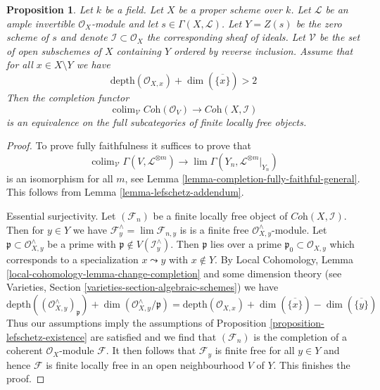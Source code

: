 \documentclass{stacks-project}
\theoremstyle{plain}
\newtheorem{proposition}[subsection]{Proposition}
\theoremstyle{definition}
\theoremstyle{remark}
\numberwithin{equation}{subsection}
\def\lim{\mathop{\mathrm{lim}}\nolimits}
\def\colim{\mathop{\mathrm{colim}}\nolimits}
\begin{document}
\begin{proposition}
\label{proposition-lefschetz-equivalence}
Let $k$ be a field. Let $X$ be a proper scheme over $k$.
Let $\mathcal{L}$ be an ample invertible $\mathcal{O}_X$-module
and let $s \in \Gamma(X, \mathcal{L})$. Let $Y = Z(s)$
be the zero scheme of $s$ and denote $\mathcal{I} \subset \mathcal{O}_X$
the corresponding sheaf of ideals.
Let $\mathcal{V}$ be the set of open subschemes of $X$ containing $Y$
ordered by reverse inclusion.
Assume that for all $x \in X \setminus Y$ we have
$$
\text{depth}(\mathcal{O}_{X, x}) + \dim(\overline{\{x\}}) > 2
$$
Then the completion functor
$$
\colim_\mathcal{V}
\textit{Coh}(\mathcal{O}_V)
\longrightarrow
\textit{Coh}(X, \mathcal{I})
$$
is an equivalence on the full subcategories of finite locally free objects.
\end{proposition}

\begin{proof}
To prove fully faithfulness it suffices to prove that
$$
\colim_\mathcal{V} \Gamma(V, \mathcal{L}^{\otimes m})
\longrightarrow
\lim \Gamma(Y_n, \mathcal{L}^{\otimes m}|_{Y_n})
$$
is an isomorphism for all $m$, see
Lemma \ref{lemma-completion-fully-faithful-general}.
This follows from Lemma \ref{lemma-lefschetz-addendum}.

\medskip\noindent
Essential surjectivity. Let $(\mathcal{F}_n)$ be a finite locally
free object of $\textit{Coh}(X, \mathcal{I})$. Then for $y \in Y$ we have
$\mathcal{F}_y^\wedge = \lim \mathcal{F}_{n, y}$ is
is a finite free $\mathcal{O}_{X, y}^\wedge$-module.
Let $\mathfrak p \subset \mathcal{O}_{X, y}^\wedge$
be a prime with $\mathfrak p \not \in V(\mathcal{I}_y^\wedge)$.
Then $\mathfrak p$ lies over a prime $\mathfrak p_0 \subset \mathcal{O}_{X, y}$
which corresponds to a specialization $x \leadsto y$ with
$x \not \in Y$. By Local Cohomology, Lemma
\ref{local-cohomology-lemma-change-completion}
and some dimension theory
(see Varieties, Section \ref{varieties-section-algebraic-schemes})
we have
$$
\text{depth}((\mathcal{O}_{X, y}^\wedge)_\mathfrak p) +
\dim(\mathcal{O}_{X, y}^\wedge/\mathfrak p) =
\text{depth}(\mathcal{O}_{X, x}) +
\dim(\overline{\{x\}}) - \dim(\overline{\{y\}})
$$
Thus our assumptions imply the assumptions of
Proposition \ref{proposition-lefschetz-existence}
are satisfied and we find that $(\mathcal{F}_n)$
is the completion of a coherent $\mathcal{O}_X$-module $\mathcal{F}$.
It then follows that $\mathcal{F}_y$ is finite free for all $y \in Y$
and hence $\mathcal{F}$ is finite locally free in an open
neighbourhood $V$ of $Y$. This finishes the proof.
\end{proof}













\end{document}
